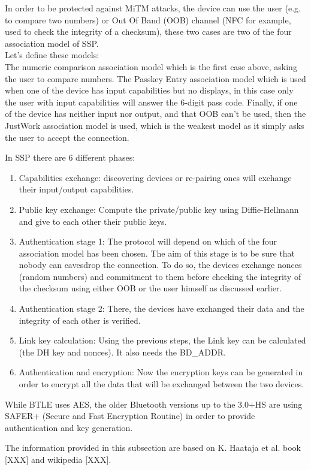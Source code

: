 In order to be protected against MiTM attacks, the device can use the user (e.g. to compare two numbers) or Out Of Band (OOB) channel (NFC for example, used to check the integrity of a checksum), these two cases are two of the four association model of SSP. \\ 
Let's define these models:\\
The numeric comparison association model which is the first case above, asking the user to compare numbers. The Passkey Entry association model which is used when one of the device has input capabilities but no displays, in this case only the user with input capabilities will answer the 6-digit pass code.
Finally, if one of the device has neither input nor output, and that OOB can't be used, then the JustWork association model is used, which is the weakest model as it simply asks the user to accept the connection. 

In SSP there are 6 different phases:
\begin{enumerate}
	\item Capabilities exchange: discovering devices or re-pairing ones will exchange their input/output capabilities.
	\item Public key exchange: Compute the private/public key using Diffie-Hellmann and give to each other their public keys. 
	\item Authentication stage 1: The protocol will depend on which of the four association model has been chosen. The aim of this stage is to be sure that nobody can eavesdrop the connection. To do so, the devices exchange nonces (random numbers) and commitment to them before checking the integrity of the checksum using either OOB or the user himself as discussed earlier. 	
	\item Authentication stage 2: There, the devices have exchanged their data and the integrity of each other is verified.
	\item Link key calculation: Using the previous steps, the Link key can be calculated (the DH key and nonces). It also needs the BD\_ADDR.
	\item Authentication and encryption: Now the encryption keys can be generated in order to encrypt all the data that will be exchanged between the two devices. 
\end{enumerate}
 
While BTLE uses AES, the older Bluetooth versions up to the 3.0+HS are using SAFER+ (Secure and Fast Encryption Routine) in order to provide authentication and key generation.

The information provided in this subsection are based on K. Haataja et al. book [XXX] and wikipedia [XXX].
